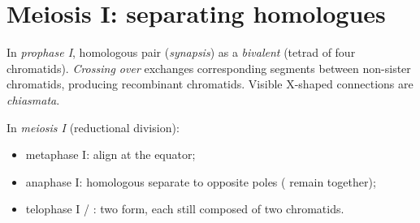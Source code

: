 \section{Meiosis I: separating homologues}

\begin{proposition}\label{prop:g11:meiosis-life-cycles:prophaseI}
In \emph{prophase I}, homologous  pair
(\emph{synapsis}) as a \emph{bivalent} (tetrad of
four chromatids). \emph{Crossing over} exchanges
corresponding segments between non-sister chromatids, producing recombinant
chromatids. Visible X-shaped connections are \emph{chiasmata}.
\end{proposition}
\admitted

\begin{definition}\label{def:g11:meiosis-life-cycles:MI}
In \emph{meiosis I} (reductional division):
\begin{itemize}
  \item metaphase I:  align at the equator;
  \item anaphase I: homologous  separate to opposite poles ( remain together);
  \item telophase I / : two   form, each  still
        composed of two chromatids.
\end{itemize}
\end{definition}

